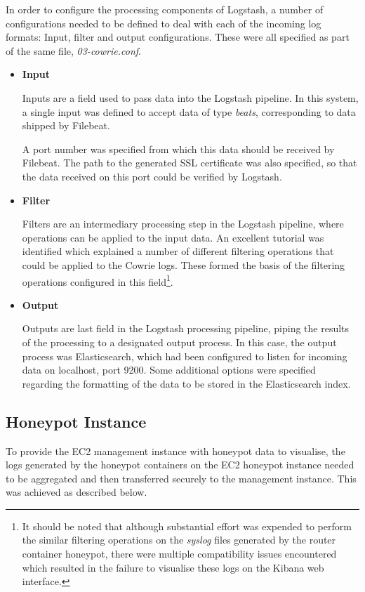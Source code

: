     In order to configure the processing components of Logstash, a number of configurations needed to be defined to deal with each of the incoming log formats: Input, filter and output configurations. These were all specified as part of the same file, \textit{03-cowrie.conf}. 
 \begin{itemize}
    \item \textbf{Input}
    
    Inputs are a field used to pass data into the Logstash pipeline. In this system, a single input was defined to accept data of type \textit{beats}, corresponding to data shipped by Filebeat. 

A port number was specified from which this data should be received by Filebeat. The path to the generated SSL certificate was also specified, so that the data received on this port could be verified by Logstash.
    \item \textbf{Filter}
    
    Filters are an intermediary processing step in the Logstash pipeline, where operations can be applied to the input data. An excellent tutorial was identified which explained a number of different filtering operations that could be applied to the Cowrie logs. These formed the basis of the filtering operations configured in this field\footnote{It should be noted that although substantial effort was expended to perform the similar filtering operations on the \textit{syslog} files generated by the router container honeypot, there were multiple compatibility issues encountered which resulted in the failure to visualise these logs on the Kibana web interface.}. \cite{FernandoDominiguezCowrieLogstashConfig}
    \item \textbf{Output}
    
    Outputs are last field in the Logstash processing pipeline, piping the results of the processing to a designated output process. In this case, the output process was Elasticsearch, which had been configured to listen for incoming data on localhost, port 9200. Some additional options were specified regarding the formatting of the data to be stored in the Elasticsearch index.
    \end{itemize}
    
    
\subsection{Honeypot Instance}
To provide the EC2 management instance with honeypot data to visualise, the logs generated by the honeypot containers on the EC2 honeypot instance needed to be aggregated and then transferred securely to the management instance. This was achieved as described below.

